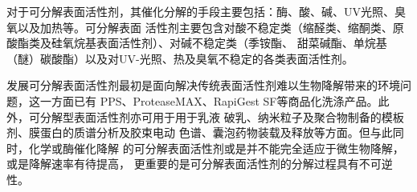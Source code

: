 \documentclass[bachelor,winfonts,replaceperiod]{jnuthesis}
\begin{document}
    对于可分解表面活性剂，其催化分解的手段主要包括：酶、酸、碱、UV光照、臭氧以及加热等。可分解表面
    活性剂主要包含对酸不稳定类（缩醛类、缩酮类、原酸酯类及硅氧烷基表面活性剂）、对碱不稳定类（季铵酯、
    甜菜碱酯、单烷基（醚）碳酸酯）以及对UV-光照、热及臭氧不稳定的各类表面活性剂\cite{hellberg2000,tehrani2007,shukla2010,narayanan2008}。    
%        
%        
%    

    
    发展可分解表面活性剂最初是面向解决传统表面活性剂难以生物降解带来的环境问题，这一方面已有
    PPS、ProteaseMAX、RapiGest SF等商品化洗涤产品。此外，可分解型表面活性剂亦可用于用于乳液
    破乳、纳米粒子及聚合物制备的模板剂\cite{liu2007}、膜蛋白的质谱分析\cite{norris2003}及胶束电动
    色谱\cite{stanley2012}、囊泡药物装载及释放\cite{guo2012}等方面。但与此同时，化学或酶催化降解
    的可分解表面活性剂或是并不能完全适应于微生物降解\cite{tehrani2007}，或是降解速率有待提高，
    更重要的是可分解表面活性剂的分解过程具有不可逆性\cite{liu2007}。
    
\end{document}
